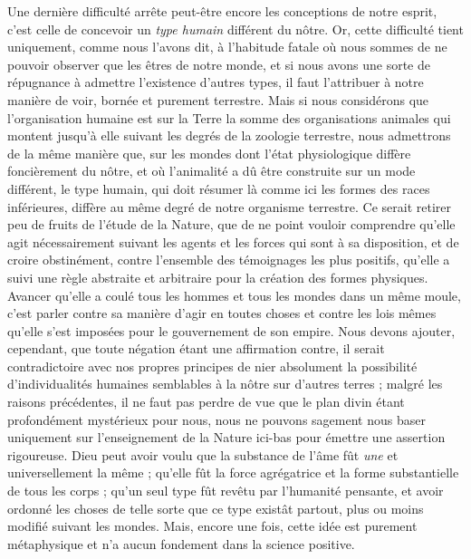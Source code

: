 \documentclass[a4paper, 11pt, oneside]{article}
\begin{document}
Une dernière difficulté arrête peut-être encore les conceptions de notre esprit, c'est celle de concevoir un \emph{type humain} différent du nôtre. Or, cette difficulté tient uniquement, comme nous l'avons dit, à l'habitude fatale où nous sommes de ne pouvoir observer que les êtres de notre monde, et si nous avons une sorte de répugnance à admettre l'existence d'autres types, il faut l'attribuer à notre manière de voir, bornée et purement terrestre. Mais si nous considérons que l'organisation humaine est sur la Terre la somme des organisations animales qui montent jusqu'à elle suivant les degrés de la zoologie terrestre, nous admettrons de la même manière que, sur les mondes dont l'état physiologique diffère foncièrement du nôtre, et où l'animalité a dû être construite sur un mode différent, le type humain, qui doit résumer là comme ici les formes des races inférieures, diffère au même degré de notre organisme terrestre. Ce serait retirer peu de fruits de l'étude de la Nature, que de ne point vouloir comprendre qu'elle agit nécessairement suivant les agents et les forces qui sont à sa disposition, et de croire obstinément, contre l'ensemble des témoignages les plus positifs, qu'elle a suivi une règle abstraite et arbitraire pour la création des formes physiques. Avancer qu'elle a coulé tous les hommes et tous les mondes dans un même moule, c'est parler contre sa manière d'agir en toutes choses et contre les lois mêmes qu'elle s'est imposées pour le gouvernement de son empire. Nous devons ajouter, cependant, que toute négation étant une affirmation contre, il serait contradictoire avec nos propres principes de nier absolument la possibilité d'individualités humaines semblables à la nôtre sur d'autres terres ; malgré les raisons précédentes, il ne faut pas perdre de vue que le plan divin étant profondément mystérieux pour nous, nous ne pouvons sagement nous baser uniquement sur l'enseignement de la Nature ici-bas pour émettre une assertion rigoureuse. Dieu peut avoir voulu que la substance de l'âme fût \emph{une} et universellement la même ; qu'elle fût la force agrégatrice et la forme substantielle de tous les corps ; qu'un seul type fût revêtu par l'humanité pensante, et avoir ordonné les choses de telle sorte que ce type existât partout, plus ou moins modifié suivant les mondes. Mais, encore une fois, cette idée est purement métaphysique et n'a aucun fondement dans la science positive.
\end{document}
